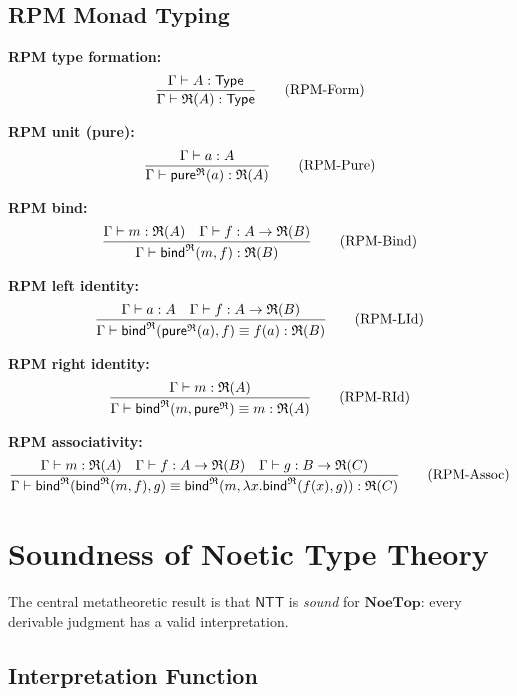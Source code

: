 \subsection{RPM Monad Typing}
\label{subsec:rpm-typing}

\begin{definition}
\label{def:rpm-monad-rules}
\textbf{RPM type formation:}
\[
  \frac{\Gamma \vdash A : \mathsf{Type}}
       {\Gamma \vdash \mathfrak{R}(A) : \mathsf{Type}}
  \tag{RPM-Form}
\]

\textbf{RPM unit (pure):}
\[
  \frac{\Gamma \vdash a : A}
       {\Gamma \vdash \mathsf{pure}^{\mathfrak{R}}(a) : \mathfrak{R}(A)}
  \tag{RPM-Pure}
\]

\textbf{RPM bind:}
\[
  \frac{\Gamma \vdash m : \mathfrak{R}(A) \quad \Gamma \vdash f : A \to \mathfrak{R}(B)}
       {\Gamma \vdash \mathsf{bind}^{\mathfrak{R}}(m, f) : \mathfrak{R}(B)}
  \tag{RPM-Bind}
\]

\textbf{RPM left identity:}
\[
  \frac{\Gamma \vdash a : A \quad \Gamma \vdash f : A \to \mathfrak{R}(B)}
       {\Gamma \vdash \mathsf{bind}^{\mathfrak{R}}(\mathsf{pure}^{\mathfrak{R}}(a), f) \equiv f(a) : \mathfrak{R}(B)}
  \tag{RPM-LId}
\]

\textbf{RPM right identity:}
\[
  \frac{\Gamma \vdash m : \mathfrak{R}(A)}
       {\Gamma \vdash \mathsf{bind}^{\mathfrak{R}}(m, \mathsf{pure}^{\mathfrak{R}}) \equiv m : \mathfrak{R}(A)}
  \tag{RPM-RId}
\]

\textbf{RPM associativity:}
\[
  \frac{\Gamma \vdash m : \mathfrak{R}(A) \quad \Gamma \vdash f : A \to \mathfrak{R}(B) \quad \Gamma \vdash g : B \to \mathfrak{R}(C)}
       {\Gamma \vdash \mathsf{bind}^{\mathfrak{R}}(\mathsf{bind}^{\mathfrak{R}}(m, f), g) \equiv \mathsf{bind}^{\mathfrak{R}}(m, \lambda x. \mathsf{bind}^{\mathfrak{R}}(f(x), g)) : \mathfrak{R}(C)}
  \tag{RPM-Assoc}
\]
\end{definition}

\section{Soundness of Noetic Type Theory}
\label{sec:ntt-soundness}

The central metatheoretic result is that $\mathsf{NTT}$ is \emph{sound} for
$\mathbf{NoeTop}$: every derivable judgment has a valid interpretation.

\subsection{Interpretation Function}
\label{subsec:interpretation-function}

